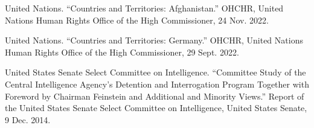 \documentclass{article}
\begin{document}
United Nations. “Countries and Territories: Afghanistan.” OHCHR, United Nations Human Rights Office of the High Commissioner, 24 Nov. 2022. 

United Nations. “Countries and Territories: Germany.” OHCHR, United Nations Human Rights Office of the High Commissioner, 29 Sept. 2022.

United States Senate Select Committee on Intelligence. “Committee Study of the Central Intelligence Agency's Detention and Interrogation Program Together with Foreword by Chairman Feinstein and Additional and Minority Views.” Report of the United States Senate Select Committee on Intelligence, United States Senate, 9 Dec. 2014.



\end{document}
